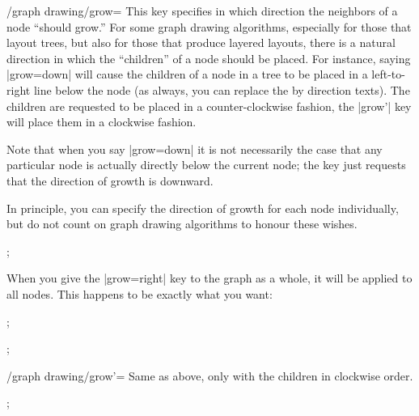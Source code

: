 \begin{key}{/graph drawing/grow=}
  This key specifies in which direction the neighbors of a node
  ``should grow.'' For some graph drawing algorithms, especially for
  those that layout trees, but also for those that produce layered
  layouts, there is a natural direction in which the ``children'' of
  a node should be placed. For instance, saying |grow=down| will cause
  the children of a node in a tree to be placed in a left-to-right
  line below the node (as always, you can replace the 
  by direction texts). The children are requested to be placed in a
  counter-clockwise fashion, the |grow'| key will place them in a
  clockwise fashion.
  
  Note that when you say |grow=down| it is not necessarily the case
  that any particular node is actually directly below the current
  node; the key just requests that the direction of growth is
  downward.
  
  In principle, you can specify the direction of growth for each node 
  individually, but do not count on graph drawing algorithms to
  honour these wishes.
  
\begin{codeexample}[]
\tikz {};
\end{codeexample}

  When you give the |grow=right| key to the graph as a whole, it will
  be applied to all nodes. This happens to be exactly what you want:
  
\begin{codeexample}[]
\tikz {};
\end{codeexample}
  
\begin{codeexample}[]
\tikz
  ;
\end{codeexample}
\end{key}
  
\begin{key}{/graph drawing/grow'=}
  Same as above, only with the children in clockwise order.
\begin{codeexample}[]
\tikz {};
\end{codeexample}
\end{key}



